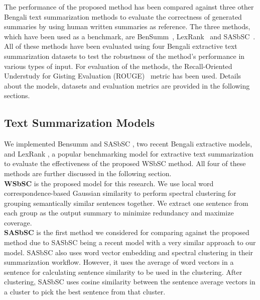 The performance of the proposed method has been compared against three other Bengali text summarization methods to evaluate the correctness of generated summaries by using human written summaries as reference. The three methods, which have been used as a benchmark, are BenSumm~\cite{chowdhury-etal-2021-tfidf-clustering}, LexRank~\cite{Erkan-lexRank-2004} and SASbSC~\cite{roychowdhury-etal-2022-spectral-base}. All of these methods have been evaluated using four Bengali extractive text summarization datasets to test the robustness of the method's performance in various types of input. For evaluation of the methods, the Recall-Oriented Understudy for Gisting Evaluation (ROUGE)~\cite{lin-2004-rouge} metric has been used. Details about the models, datasets and evaluation metrics are provided in the following sections.

\subsection{Text Summarization Models}\label{subsec:text-summarization-models}
We implemented Bensumm \cite{chowdhury-etal-2021-tfidf-clustering} and SASbSC \cite{roychowdhury-etal-2022-spectral-base}, two recent Bengali extractive models, and LexRank \cite{Erkan-lexRank-2004}, a popular benchmarking model for extractive text summarization to evaluate the effectiveness of the proposed WSbSC method. All four of these methods are further discussed in the following section.\\

\textbf{WSbSC} is the proposed model for this research. We use local word correspondence-based Gaussian similarity to perform spectral clustering for grouping semantically similar sentences together. We extract one sentence from each group as the output summary to minimize redundancy and maximize coverage.\\

\textbf{SASbSC} \cite{roychowdhury-etal-2022-spectral-base} is the first method we considered for comparing against the proposed method due to SASbSC being a recent model with a very similar approach to our model. SASbSC also uses word vector embedding and spectral clustering in their summarization workflow. However, it uses the average of word vectors in a sentence for calculating sentence similarity to be used in the clustering. After clustering, SASbSC uses cosine similarity between the sentence average vectors in a cluster to pick the best sentence from that cluster.\\

